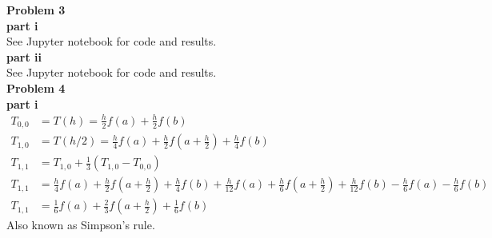 \documentclass{article} %
\begin{document}
\textbf{Problem 3} \\

\textbf{part i} \\
See Jupyter notebook for code and results.  
\\

\textbf{part ii} \\
See Jupyter notebook for code and results.  
\\


\textbf{Problem 4} \\
\textbf{part i} \\
\begin{align*}
T_{0,0} &= T(h) = \frac{h}{2}f(a) + \frac{h}{2}f(b) \\
T_{1,0} &= T(h/2) = \frac{h}{4}f(a) +\frac{h}{2}f(a+\frac{h}{2}) + \frac{h}{4}f(b) \\
T_{1,1} &= T_{1,0} + \frac{1}{3}(T_{1,0} - T_{0,0}) \\
T_{1,1} &= \frac{h}{4}f(a) +\frac{h}{2}f(a+\frac{h}{2}) + \frac{h}{4}f(b) + \frac{h}{12}f(a) +\frac{h}{6}f(a+\frac{h}{2}) + \frac{h}{12}f(b) - \frac{h}{6}f(a) - \frac{h}{6}f(b) \\
T_{1,1} &= \frac{1}{6}f(a) + \frac{2}{3}f(a+\frac{h}{2}) + \frac{1}{6}f(b)
\end{align*}  
Also known as Simpson's rule.
\\
\end{document}
